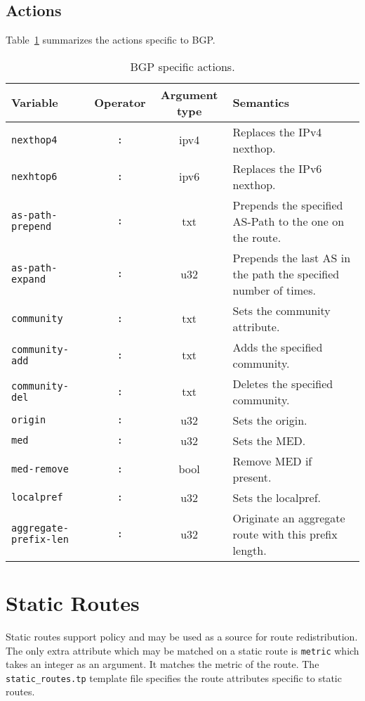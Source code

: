 \subsection{Actions}
Table~\ref{policy_bgp_action} summarizes the actions specific to BGP.
\begin{table}[h]
\centering
\begin{tabular}{|l|c|c|p{7cm}|}
\hline
Variable & Operator & Argument type & Semantics \\
\hline\hline
{\tt nexthop4} & {\tt :} & ipv4 & Replaces the IPv4 nexthop. \\
{\tt nexhtop6} & {\tt :} & ipv6 & Replaces the IPv6 nexthop. \\
\hline
{\tt as-path-prepend} & {\tt :} & txt & Prepends the specified AS-Path to the
one on the route. \\
{\tt as-path-expand} & {\tt :} & u32 & Prepends the last AS in the path the
specified number of times. \\
\hline
{\tt community} & {\tt :} & txt &  Sets the community attribute.\\
{\tt community-add} & {\tt :} & txt & Adds the specified community. \\
\hline
{\tt community-del} & {\tt :} & txt & Deletes the specified community. \\
\hline
{\tt origin} & {\tt :} & u32 & Sets the origin. \\
\hline
{\tt med} & {\tt :} & u32 & Sets the MED. \\
\hline
{\tt med-remove} & {\tt :} & bool & Remove MED if present. \\
\hline
{\tt localpref} & {\tt :} & u32 & Sets the localpref. \\
\hline
{\tt aggregate-prefix-len} & {\tt :} & u32 & Originate an aggregate route with
this prefix length. \\
\hline
\end{tabular}
\caption{\label{policy_bgp_action}BGP specific actions.}
\end{table}

\section{Static Routes}
Static routes support policy and may be used as a source for route
redistribution.  The only extra attribute which may be matched on a static route
is {\tt metric} which takes an integer as an argument.  It matches the metric of
the route.  The {\tt static\_routes.tp} template file specifies the route
attributes specific to static routes.

